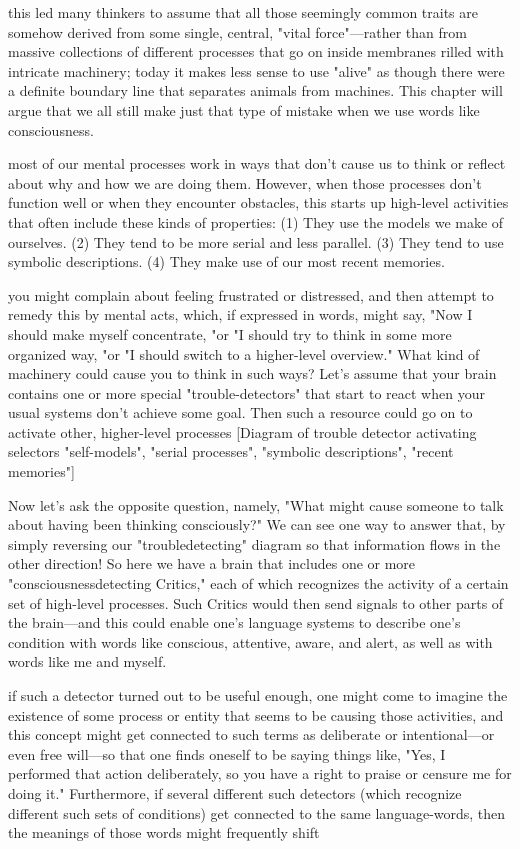 \documentclass[10pt,a4paper]{article}
\begin{document}
this led many thinkers to assume that all those seemingly common traits are somehow derived from some single, central, "vital force"—rather than from massive collections of different processes that go on inside membranes rilled with intricate machinery; today it makes less sense to use "alive" as though there were a definite boundary line that separates animals from machines. This chapter will argue that we all still make just that type of mistake when we use words like consciousness. \cite[p.~111]{minsky}

most of our mental processes work in ways that don't cause us to think or reflect about why and how we are doing them. However, when those processes don't function well or when they encounter obstacles, this starts up high-level activities that often include these kinds of properties:
(1) They use the models we make of ourselves.
(2) They tend to be more serial and less parallel.
(3) They tend to use symbolic descriptions.
(4) They make use of our most recent memories.
\cite[p.~112]{minsky}

you might complain about feeling frustrated or distressed, and then attempt to remedy this by mental acts, which, if expressed in words, might say, "Now I should make myself concentrate, "or "I should try to think in some more organized way, "or "I should switch to a higher-level overview."
What kind of machinery could cause you to think in such ways? Let's assume that your brain contains one or more special "trouble-detectors" that start to react when your usual systems don't achieve some goal. Then such a resource could go on to activate other, higher-level processes 
[Diagram of trouble detector activating selectors "self-models", "serial processes", "symbolic descriptions", "recent memories"]\cite[p.~113]{minsky}

Now let's ask the opposite question, namely, "What might cause someone to talk about having been thinking consciously?" We can see one way to answer that, by simply reversing our "troubledetecting" diagram so that information flows in the other direction! So here we have a brain that includes one or more "consciousnessdetecting Critics," each of which recognizes the activity of a certain set of high-level processes. Such Critics would then send signals to other parts of the brain—and this could enable one's language systems to describe one's condition with words like conscious, attentive, aware, and alert, as well as with words like me and myself. \cite[p.~116]{minsky}

if such a detector turned out to be useful enough, one might come to imagine the existence of some process or entity that seems to be causing those activities, and this concept might get connected to such terms as deliberate or intentional—or even free will—so that one finds oneself to be saying things like, "Yes, I performed that action deliberately, so you have a right to praise or censure me for doing it." Furthermore, if several different such detectors (which recognize different such sets of conditions) get connected to the same language-words, then the meanings of those words might frequently shift \cite[p.~117]{minsky}
\end{document}
